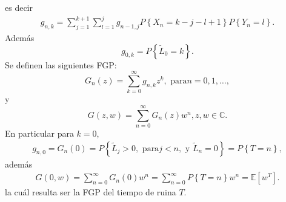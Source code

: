 \documentclass{article}
\newcommand{\esp}{\mathbb{E}}
\numberwithin{equation}{section}
\begin{document}
es decir
\begin{eqnarray}\label{Eq.Gnk.2S}
g_{n,k}=\sum_{j=1}^{k+1}\sum_{l=1}^{j}g_{n-1,j}P\left\{X_{n}=k-j-l+1\right\}P\left\{Y_{n}=l\right\}.
\end{eqnarray}
Adem\'as
\begin{equation}\label{Eq.L02S}
g_{0,k}=P\left\{\tilde{L}_{0}=k\right\}.
\end{equation}
Se definen las siguientes FGP:
\begin{equation}\label{Eq.3.16.a.2S}
G_{n}\left(z\right)=\sum_{k=0}^{\infty}g_{n,k}z^{k},\textrm{ para
}n=0,1,\ldots,
\end{equation}
y 
\begin{equation}\label{Eq.3.16.b.2S}
G\left(z,w\right)=\sum_{n=0}^{\infty}G_{n}\left(z\right)w^{n}, z,w\in\mathbb{C}.
\end{equation}
En particular para $k=0$,
\begin{eqnarray*}
g_{n,0}=G_{n}\left(0\right)=P\left\{\tilde{L}_{j}>0,\textrm{ para
}j<n,\textrm{ y }\tilde{L}_{n}=0\right\}=P\left\{T=n\right\},
\end{eqnarray*}
adem\'as
\begin{eqnarray*}%
G\left(0,w\right)=\sum_{n=0}^{\infty}G_{n}\left(0\right)w^{n}=\sum_{n=0}^{\infty}P\left\{T=n\right\}w^{n}
=\esp\left[w^{T}\right].
\end{eqnarray*}
la cu\'al resulta ser la FGP del tiempo de ruina $T$.
\end{document}
